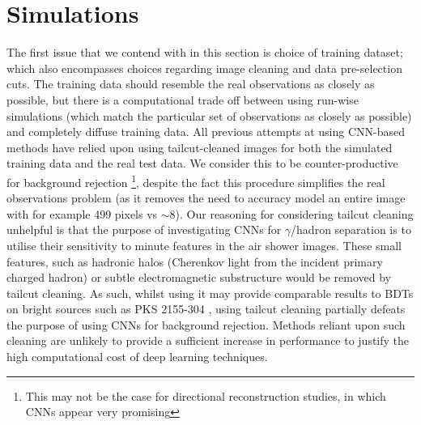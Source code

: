\section{Simulations}
The first issue that we contend with in this section is choice of training dataset; which also encompasses choices regarding image cleaning and data pre-selection cuts. The training data should resemble the real observations as closely as possible, but there is a computational trade off between using run-wise simulations (which match the particular set of observations as closely as possible) and completely diffuse training data. All previous attempts at using CNN-based methods have relied upon using tailcut-cleaned images \cite{Shilon} for both the simulated training data and the real test data. We consider this to be counter-productive for background rejection \footnote{This may not be the case for directional reconstruction studies, in which CNNs appear very promising}, despite the fact this procedure simplifies the real observations problem (as it removes the need to accuracy model an entire image with for example 499 pixels vs $\sim$8). Our reasoning for considering tailcut cleaning unhelpful is that the purpose of investigating CNNs for $\gamma$/hadron separation is to utilise their sensitivity to minute features in the air shower images. These small features, such as hadronic halos \cite{model++} (Cherenkov light from the incident primary charged hadron) or subtle electromagnetic substructure would be removed by tailcut cleaning. As such, whilst using it may provide comparable results to BDTs on bright sources such as PKS 2155-304 \cite{Shilon}, using tailcut cleaning partially defeats the purpose of using CNNs for background rejection. Methods reliant upon such cleaning are unlikely to provide a sufficient increase in performance to justify the high computational cost of deep learning techniques.

